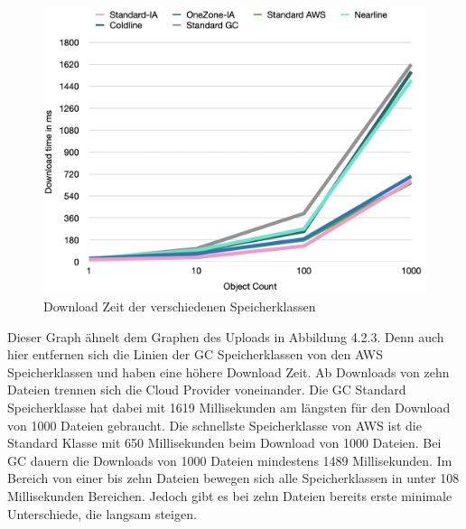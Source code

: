 \begin{figure}[h]
	\centering
	\includegraphics[width=14cm,keepaspectratio]{Pictures/DownloadTime.png}
	\caption{Download Zeit der verschiedenen Speicherklassen}
\end{figure}

Dieser Graph ähnelt dem Graphen des Uploads in Abbildung 4.2.3. Denn auch hier entfernen sich die Linien der GC Speicherklassen von den AWS Speicherklassen und haben eine höhere Download Zeit. Ab Downloads von zehn Dateien trennen sich die Cloud Provider voneinander. Die GC Standard Speicherklasse hat dabei mit 1619 Millisekunden am längsten für den Download von 1000 Dateien gebraucht. Die schnellste Speicherklasse von AWS ist die Standard Klasse mit 650 Millisekunden beim Download von 1000 Dateien. Bei GC dauern die Downloads von 1000 Dateien mindestens 1489 Millisekunden. Im Bereich von einer bis zehn Dateien bewegen sich alle Speicherklassen in unter 108 Millisekunden Bereichen. Jedoch gibt es bei zehn Dateien bereits erste minimale Unterschiede, die langsam steigen.\\
 